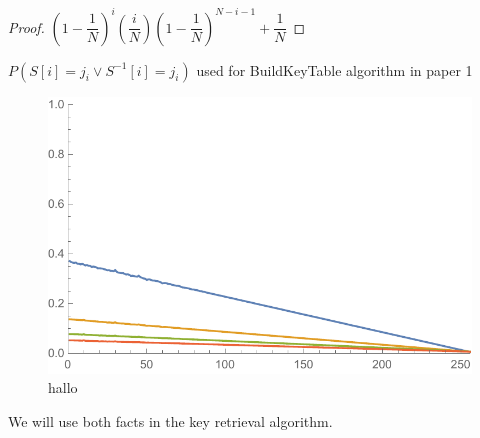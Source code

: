 \begin{proof}
		$ (1-\dfrac{1}{N})^{i}(\dfrac{i}{N})(1-\dfrac{1}{N})^{N-i-1}+ \dfrac{1}{N} $
\end{proof}

\begin{thm}
	$ P(S[i] = j_{i} \vee S^{-1}[i] = j_{i}) $ used for BuildKeyTable algorithm in paper 1
\end{thm}




\TODO{ $ P(S[S[S[i]] = j_{i}) $}

\begin{figure}
\centering
\includegraphics[width=0.7\linewidth]{img/all}
\caption[All]{hallo}
\label{fig:all}
\end{figure}






We will use both facts in the key retrieval algorithm.
